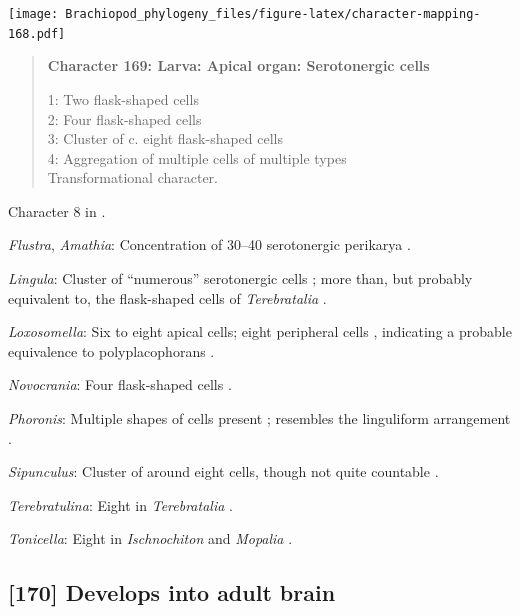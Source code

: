 \documentclass[openany]{book}
\begin{document}
\texttt{[image: Brachiopod\_phylogeny\_files/figure-latex/character-mapping-168.pdf]}

\begin{quote}
\textbf{Character 169: Larva: Apical organ: Serotonergic cells}

1: Two flask-shaped cells\\
2: Four flask-shaped cells\\
3: Cluster of c. eight flask-shaped cells\\
4: Aggregation of multiple cells of multiple types\\
Transformational character.
\end{quote}

Character 8 in \citet{Haszprunar2008}.

\hypertarget{Amathia-coding-169}{}
\emph{Flustra}, \emph{Amathia}: Concentration of 30--40 serotonergic
perikarya \citep[in \emph{Fredericella};][]{Gruhl2010F}.

\hypertarget{Lingula-coding-169}{}
\emph{Lingula}: Cluster of ``numerous'' serotonergic cells
\citep{HaySchmidt1992, Altenburger2010}; more than, but probably
equivalent to, the flask-shaped cells of \emph{Terebratalia}
\citep{Luter2016}.

\hypertarget{Loxosomella-coding-169}{}
\emph{Loxosomella}: Six to eight apical cells; eight peripheral cells
\citep{Wanninger2007}, indicating a probable equivalence to
polyplacophorans \citep{Haszprunar2008}.

\hypertarget{Novocrania-coding-169}{}
\emph{Novocrania}: Four flask-shaped cells \citep{Altenburger2010}.

\hypertarget{Phoronis-coding-169}{}
\emph{Phoronis}: Multiple shapes of cells present \citep{Santagata2002};
resembles the linguliform arrangement \citep{Altenburger2010}.

\hypertarget{Sipunculus-coding-169}{}
\emph{Sipunculus}: Cluster of around eight cells, though not quite
countable \citep{Wanninger2005}.

\hypertarget{Terebratulina-coding-169}{}
\emph{Terebratulina}: Eight in \emph{Terebratalia} \citep{Luter2016}.

\hypertarget{Tonicella-coding-169}{}
\emph{Tonicella}: Eight in \emph{Ischnochiton} and \emph{Mopalia}
\citep{Wanninger2007}.

\subsection*{{[}170{]} Develops into adult
brain}\label{develops-into-adult-brain}
\end{document}
